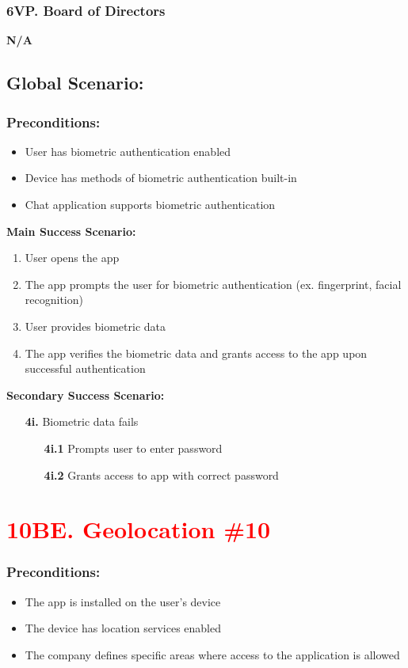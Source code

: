 \documentclass[]{article}
\begin{document}
\subsubsection*{6VP. Board of Directors}
\textbf{N/A}

\subsection*{Global Scenario:}
\subsubsection*{Preconditions:}
\begin{itemize}
	\item User has biometric authentication enabled
	\item Device has methods of biometric authentication built-in
	\item Chat application supports biometric authentication
\end{itemize}
\textbf{Main Success Scenario:}
\begin{enumerate}
	\item User opens the app
	\item The app prompts the user for biometric authentication (ex. fingerprint, facial recognition)
	\item User provides biometric data
	\item The app verifies the biometric data and grants access to the app upon successful authentication
\end{enumerate}
\textbf{Secondary Success Scenario:}
\begin{enumerate}
	\item[\textbf{4i.}] Biometric data fails
		\begin{enumerate}
			\item[\textbf{4i.1}] Prompts user to enter password
			\item[\textbf{4i.2}] Grants access to app with correct password
		\end{enumerate}
\end{enumerate}


\section*{\textcolor{red}{10BE. Geolocation \#10}}
\subsubsection*{Preconditions:}
\begin{itemize}
	\item The app is installed on the user's device
	\item The device has location services enabled
	\item The company defines specific areas where access to the application is allowed
\end{itemize}
\end{document}
